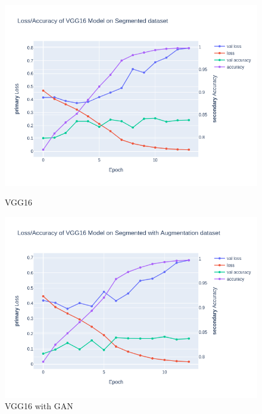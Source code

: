 \documentclass[12pt]{diazessay}
\begin{document}
    \begin{figure}[H]
        \centering
        \begin{minipage}[b]{0.45\textwidth}
            \centering
            \includegraphics[width=\textwidth]{charts/VGG16_classification.png}
            \caption{\small{VGG16}}
        \end{minipage}
        \hfill
        \begin{minipage}[b]{0.45\textwidth}
            \centering
            \includegraphics[width=\textwidth]{charts/VGG16_classificationWithGAN.png}
            \caption{ \small {VGG16 with GAN}}
        \end{minipage}
    \end{figure}
\end{document}
